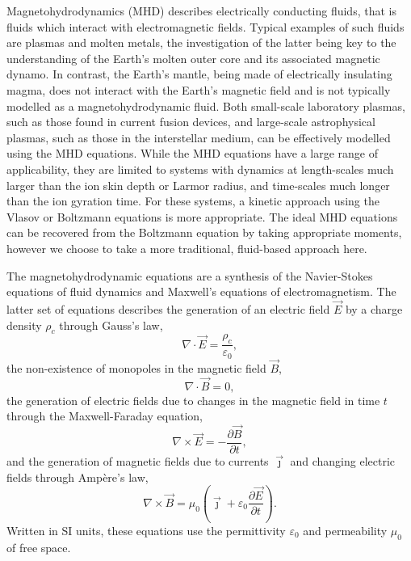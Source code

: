 Magnetohydrodynamics (MHD) describes electrically conducting fluids, that is fluids which interact with electromagnetic fields. Typical examples of such fluids are plasmas and molten metals, the investigation of the latter being key to the understanding of the Earth's molten outer core and its associated magnetic dynamo. In contrast, the Earth's mantle, being made of electrically insulating magma, does not interact with the Earth's magnetic field and is not typically modelled as a magnetohydrodynamic fluid. Both small-scale laboratory plasmas, such as those found in current fusion devices, and large-scale astrophysical plasmas, such as those in the interstellar medium, can be effectively modelled using the MHD equations. While the MHD equations have a large range of applicability, they are limited to systems with dynamics at length-scales much larger than the ion skin depth or Larmor radius, and time-scales much longer than the ion gyration time. For these systems, a kinetic approach using the Vlasov or Boltzmann equations is more appropriate. The ideal MHD equations can be recovered from the Boltzmann equation by taking appropriate moments, however we choose to take a more traditional, fluid-based approach here.

The magnetohydrodynamic equations are a synthesis of the Navier-Stokes equations of fluid dynamics and Maxwell's equations of electromagnetism. The latter set of equations describes the generation of an electric field $\vec{E}$ by a charge density $\rho_c$ through Gauss's law,
\begin{equation}
  \label{eq:gauss_law}
 \nabla \cdot \vec {E} ={\frac {\rho_c }{\varepsilon _{0}}},
\end{equation}
the non-existence of monopoles in the magnetic field $\vec{B}$,
\begin{equation}
  \label{eq:gauss_law_for_magnetism}
  \nabla \cdot \vec {B} =0,
\end{equation}
the generation of electric fields due to changes in the magnetic field in time $t$ through the Maxwell-Faraday equation,
\begin{equation}
  \label{eq:maxwell_faraday}
 \nabla \times \vec {E} =-{\frac {\partial \vec {B} }{\partial t}},
\end{equation}
and the generation of magnetic fields due to currents $\vec{\jmath}$ and changing electric fields through Ampère's law,
\begin{equation}
  \label{eq:ampere_law}
 \nabla \times \vec {B} =\mu _{0}\left(\vec {\jmath} +\varepsilon _{0}{\frac {\partial \vec {E} }{\partial t}}\right).
\end{equation}
Written in SI units, these equations use the permittivity $\varepsilon_{0}$ and permeability $\mu_0$ of free space.

